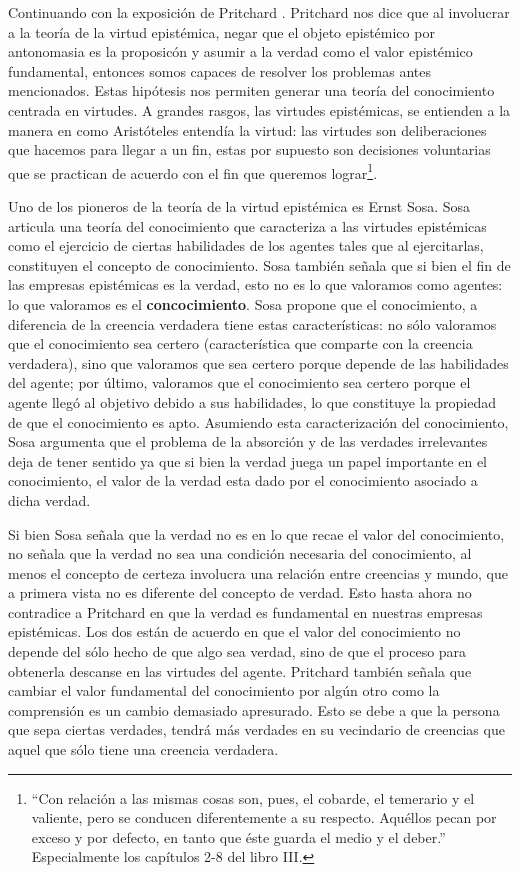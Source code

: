 \documentclass[12pt]{article}
\begin{document}
Continuando con la exposición de Pritchard \cite{Pritchard2021}. Pritchard nos dice que al involucrar a la teoría de la virtud epistémica, negar que el objeto epistémico por antonomasia es la proposicón y asumir a la verdad como el valor epistémico fundamental, entonces somos capaces de resolver los problemas antes mencionados. Estas hipótesis nos permiten generar una teoría del conocimiento centrada en virtudes. A grandes rasgos, las virtudes epistémicas, se entienden a la manera en como Aristóteles entendía la virtud: las virtudes son deliberaciones que hacemos para llegar a un fin, estas por supuesto son decisiones voluntarias que se practican de acuerdo con el fin que queremos lograr\footnote{``Con relación a las mismas cosas son, pues, el cobarde, el temerario y el valiente, pero se conducen diferentemente a su respecto. Aquéllos pecan por exceso y por defecto, en tanto que éste guarda el medio y el deber.'' \cite{aristotelesnico} Especialmente los capítulos 2-8 del libro III.}. 

Uno de los pioneros de la teoría de la virtud epistémica es Ernst Sosa. Sosa \citeyear{Sosa2017-SOSE} articula una teoría del conocimiento que caracteriza a las virtudes epistémicas  como el ejercicio de ciertas habilidades de los agentes tales que al ejercitarlas, constituyen el concepto de conocimiento. Sosa también señala que si bien el fin de las empresas epistémicas es la verdad, esto no es lo que valoramos como agentes: lo que valoramos es el \textbf{concocimiento}. Sosa \citeyear[pp. 11-113]{Sosa2017-SOSE} propone que el conocimiento, a diferencia de la creencia verdadera tiene estas características: no sólo valoramos que el conocimiento sea certero (característica que comparte con la creencia verdadera), sino que valoramos que sea certero porque depende de las habilidades del agente; por último, valoramos que el conocimiento sea certero porque el agente llegó al objetivo debido a sus habilidades, lo que constituye la propiedad de que el conocimiento es apto. Asumiendo esta caracterización del conocimiento, Sosa argumenta que el problema de la absorción y de las verdades irrelevantes deja de tener sentido ya que si bien la verdad juega un papel importante en el conocimiento, el valor de la verdad esta dado por el conocimiento asociado a dicha verdad.

Si bien Sosa señala que la verdad no es en lo que recae el valor del conocimiento, no señala que la verdad no sea una condición necesaria del conocimiento, al menos el concepto de certeza involucra una relación entre creencias y mundo, que a primera vista no es diferente del concepto de verdad. Esto hasta ahora no contradice a Pritchard en que la verdad es fundamental en nuestras empresas epistémicas. Los dos están de acuerdo en que el valor del conocimiento no depende del sólo hecho de que algo sea verdad, sino de que el proceso para obtenerla descanse en las virtudes del agente. Pritchard también señala que cambiar el valor fundamental del conocimiento por algún otro como la comprensión es un cambio demasiado apresurado. Esto se debe a que la persona que sepa ciertas verdades, tendrá más verdades en su vecindario de creencias que aquel que sólo tiene una creencia verdadera.
\end{document}
